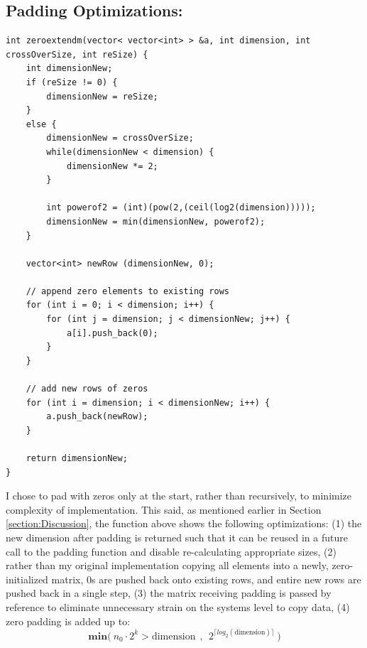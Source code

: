 \documentclass[conference]{styles/acmsiggraph}
\newcommand{\?}{\stackrel{?}{=}}
\begin{document}
\subsection{Padding Optimizations:}
\begin{verbatim}
int zeroextendm(vector< vector<int> > &a, int dimension, int crossOverSize, int reSize) {
    int dimensionNew;
    if (reSize != 0) {
        dimensionNew = reSize;
    }
    else {
        dimensionNew = crossOverSize;
        while(dimensionNew < dimension) {
            dimensionNew *= 2;
        }

        int powerof2 = (int)(pow(2,(ceil(log2(dimension)))));
        dimensionNew = min(dimensionNew, powerof2);
    }

    vector<int> newRow (dimensionNew, 0);

    // append zero elements to existing rows
    for (int i = 0; i < dimension; i++) {
        for (int j = dimension; j < dimensionNew; j++) {
            a[i].push_back(0);
        }
    }

    // add new rows of zeros
    for (int i = dimension; i < dimensionNew; i++) {
        a.push_back(newRow);
    }

    return dimensionNew;
}
\end{verbatim}

I chose to pad with zeros only at the start, rather than recursively, to minimize complexity of implementation.  This said, as mentioned earlier in Section \ref{section:Discussion}, the function above shows the following optimizations:  (1) the new dimension after padding is returned such that it can be reused in a future call to the padding function and disable re-calculating appropriate sizes, (2) rather than my original implementation copying all elements into a newly, zero-initialized matrix, 0s are pushed back onto existing rows, and entire new rows are pushed back in a single step, (3) the matrix receiving padding is passed by reference to eliminate unnecessary strain on the systems level to copy data, (4) zero padding is added up to: 
$$\mathbf{min(}\ n_0 \cdot 2^k > \text{dimension}\ \ \mathbf{,}\ \  2^{ \lceil log_2(\text{dimension}) \rceil }\ \mathbf{)}$$
\end{document}
